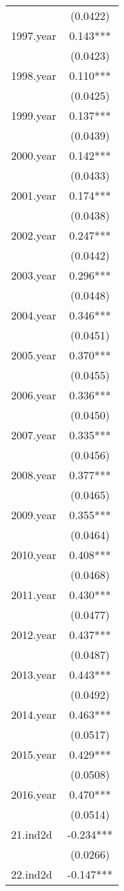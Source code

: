 \documentclass[]{article}
\begin{document}
\begin{tabular}{lc}
 & (0.0422) \\
1997.year & 0.143*** \\
 & (0.0423) \\
1998.year & 0.110*** \\
 & (0.0425) \\
1999.year & 0.137*** \\
 & (0.0439) \\
2000.year & 0.142*** \\
 & (0.0433) \\
2001.year & 0.174*** \\
 & (0.0438) \\
2002.year & 0.247*** \\
 & (0.0442) \\
2003.year & 0.296*** \\
 & (0.0448) \\
2004.year & 0.346*** \\
 & (0.0451) \\
2005.year & 0.370*** \\
 & (0.0455) \\
2006.year & 0.336*** \\
 & (0.0450) \\
2007.year & 0.335*** \\
 & (0.0456) \\
2008.year & 0.377*** \\
 & (0.0465) \\
2009.year & 0.355*** \\
 & (0.0464) \\
2010.year & 0.408*** \\
 & (0.0468) \\
2011.year & 0.430*** \\
 & (0.0477) \\
2012.year & 0.437*** \\
 & (0.0487) \\
2013.year & 0.443*** \\
 & (0.0492) \\
2014.year & 0.463*** \\
 & (0.0517) \\
2015.year & 0.429*** \\
 & (0.0508) \\
2016.year & 0.470*** \\
 & (0.0514) \\
21.ind2d & -0.234*** \\
 & (0.0266) \\
22.ind2d & -0.147*** \\

\end{tabular}
\end{document}
